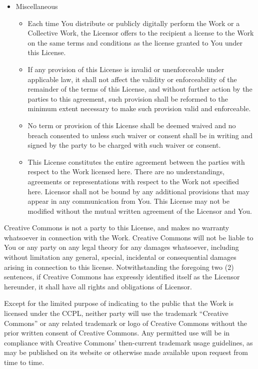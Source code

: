 \documentclass{article}
\begin{document}
\begin{itemize}
\item Miscellaneous

\begin{itemize} \item Each time You distribute or publicly digitally
perform the Work or a Collective Work, the Licensor offers to the
recipient a license to the Work on the same terms and conditions as
the license granted to You under this License.

\item If any provision of this License is invalid or unenforceable
under applicable law, it shall not affect the validity or
enforceability of the remainder of the terms of this License, and
without further action by the parties to this agreement, such
provision shall be reformed to the minimum extent necessary to make
such provision valid and enforceable.

\item No term or provision of this License shall be deemed waived and
no breach consented to unless such waiver or consent shall be in
writing and signed by the party to be charged with such waiver or
consent.

\item This License constitutes the entire agreement between the parties
with respect to the Work licensed here.  There are no understandings,
agreements or representations with respect to the Work not specified
here.  Licensor shall not be bound by any additional provisions that
may appear in any communication from You.  This License may not be
modified without the mutual written agreement of the Licensor and
You.\end{itemize} \end{itemize}

Creative Commons is not a party to this License, and makes no warranty
whatsoever in connection with the Work.  Creative Commons will not be
liable to You or any party on any legal theory for any damages
whatsoever, including without limitation any general, special,
incidental or consequential damages arising in connection to this
license.  Notwithstanding the foregoing two (2) sentences, if Creative
Commons has expressly identified itself as the Licensor hereunder, it
shall have all rights and obligations of Licensor.

Except for the limited purpose of indicating to the public that the
Work is licensed under the CCPL, neither party will use the trademark
``Creative Commons'' or any related trademark or logo of Creative
Commons without the prior written consent of Creative Commons.  Any
permitted use will be in compliance with Creative Commons'
then-current trademark usage guidelines, as may be published on its
website or otherwise made available upon request from time to time.
\end{document}
